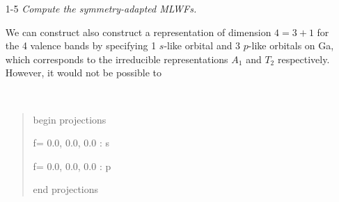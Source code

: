 \begin{itemize}
	\item[1-5] {\it  Compute the symmetry-adapted MLWFs.}

	We can construct also construct a representation of dimension $4=3+1$ for the 4 valence bands by specifying 1 $s$-like orbital and 3 $p$-like orbitals on Ga, which corresponds to the irreducible representations $A_1$ and $T_2$ respectively. However, it would not be possible to  
{\tt
\begin{quote}
begin projections

f= 0.0, 0.0, 0.0 : s

f= 0.0, 0.0, 0.0 : p

end projections
\end{quote}
}

\end{itemize}
